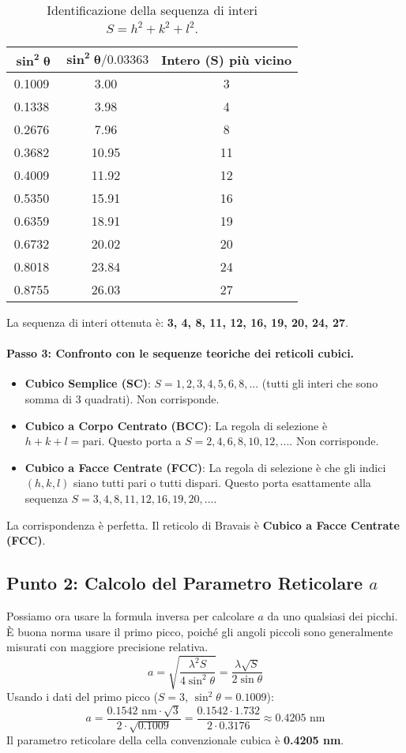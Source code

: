 \begin{table}[h!]
\centering
\begin{tabular}{|c|c|c|}
\hline
$\mathbf{\sin^2\theta}$ & $\mathbf{\sin^2\theta / 0.03363}$ & \textbf{Intero (S) più vicino} \\
\hline
0.1009 & 3.00 & 3 \\
0.1338 & 3.98 & 4 \\
0.2676 & 7.96 & 8 \\
0.3682 & 10.95 & 11 \\
0.4009 & 11.92 & 12 \\
0.5350 & 15.91 & 16 \\
0.6359 & 18.91 & 19 \\
0.6732 & 20.02 & 20 \\
0.8018 & 23.84 & 24 \\
0.8755 & 26.03 & 27 \\
\hline
\end{tabular}
\caption{Identificazione della sequenza di interi $S = h^2+k^2+l^2$.}
\end{table}

La sequenza di interi ottenuta è: \textbf{3, 4, 8, 11, 12, 16, 19, 20, 24, 27}.

\paragraph{Passo 3: Confronto con le sequenze teoriche dei reticoli cubici.}
\begin{itemize}
    \item \textbf{Cubico Semplice (SC)}: $S = 1, 2, 3, 4, 5, 6, 8, ...$ (tutti gli interi che sono somma di 3 quadrati). Non corrisponde.
    \item \textbf{Cubico a Corpo Centrato (BCC)}: La regola di selezione è $h+k+l = \text{pari}$. Questo porta a $S = 2, 4, 6, 8, 10, 12, ...$. Non corrisponde.
    \item \textbf{Cubico a Facce Centrate (FCC)}: La regola di selezione è che gli indici $(h,k,l)$ siano tutti pari o tutti dispari. Questo porta esattamente alla sequenza $S = 3, 4, 8, 11, 12, 16, 19, 20, ...$.
\end{itemize}
La corrispondenza è perfetta. Il reticolo di Bravais è \textbf{Cubico a Facce Centrate (FCC)}.

\subsection{Punto 2: Calcolo del Parametro Reticolare $a$}
Possiamo ora usare la formula inversa per calcolare $a$ da uno qualsiasi dei picchi. È buona norma usare il primo picco, poiché gli angoli piccoli sono generalmente misurati con maggiore precisione relativa.
$$ a = \sqrt{\frac{\lambda^2 S}{4 \sin^2\theta}} = \frac{\lambda \sqrt{S}}{2 \sin\theta} $$
Usando i dati del primo picco ($S=3$, $\sin^2\theta=0.1009$):
$$ a = \frac{0.1542 \text{ nm} \cdot \sqrt{3}}{2 \cdot \sqrt{0.1009}} = \frac{0.1542 \cdot 1.732}{2 \cdot 0.3176} \approx 0.4205 \text{ nm} $$
Il parametro reticolare della cella convenzionale cubica è \textbf{0.4205 nm}.


